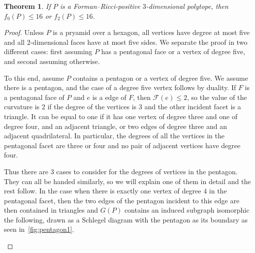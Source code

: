 \documentclass[11pt,a4paper]{amsart}
\newtheorem{theorem}{Theorem}[section]
\begin{document}
\begin{theorem}\label{thm:3polytope-degree}
    If $P$ is a Forman--Ricci-positive $3$-dimensional polytope, then $f_0(P) \le 16$ or $f_2(P)\le 16$. 
\end{theorem}
    
\begin{proof}
    Unless $P$ is a pryamid over a hexagon, all vertices have degree at most five and all $2$-dimensional faces have at most five sides. We separate the proof in two different cases: first assuming $P$ has a pentagonal face or a vertex of degree five, and second assuming otherwise.

    To this end, assume $P$ contains a pentagon or a vertex of degree five. We assume there is a pentagon, and the case of a degree five vertex follows by duality. If $F$ is a pentagonal face of $P$ and $e$ is a edge of $F$, then $\mathcal{F}(e) \le 2$, so the value of the curvature is $2$ if the degree of the vertices is $3$ and the other incident facet is a triangle. It can be equal to one if it has one vertex of degree three and one of degree four, and an adjacent triangle, or two edges of degree three and an adjacent quadrilateral. In particular, the degrees of all the vertices in the pentagonal facet are three or four and no pair of adjacent vertices have degree four. 

    Thus there are 3 cases to consider for the degrees of vertices in the pentagon. They can all be handed similarly, so we will explain one of them in detail and the rest follow. In the case when there is exactly one vertex of degree $4$ in the pentagonal facet, then the two edges of the pentagon incident to this edge are then contained in triangles and $G(P)$ contains an induced subgraph isomorphic the  following, drawn as a Schlegel diagram with the pentagon as its boundary as seen in~\cref{fig:pentagon1}.

    \begin{figure}
        \begin{subfigure}{0.3\textwidth}
            \centering
\end{subfigure}
\end{figure}
\end{proof}
\end{document}

